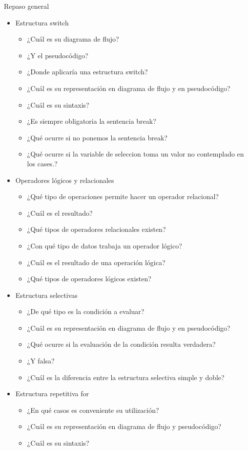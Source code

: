 \documentclass[xcolor=pdftex,table,11pt]{beamer}
\begin{document}
\begin{frame}[allowframebreaks]{Repaso general}
\begin{itemize}
		\item Estructura switch
		\begin{itemize}
		\item  ¿Cuál es su diagrama de flujo?
		\item  ¿Y el pseudocódigo? 
		\item  ¿Donde aplicaría una estructura switch?
		\item ¿Cuál es su representación en diagrama de flujo y en pseudocódigo?
		\item  ¿Cuál es su sintaxis?
		
		\item  ¿Es siempre obligatoria la sentencia break? 
		\item  ¿Qué ocurre si no ponemos la sentencia break? 
		\item  ¿Qué ocurre si la variable de seleccion toma un valor no contemplado en los cases.? 
		\end{itemize}
		
		
		\item Operadores lógicos y relacionales
		\begin{itemize}
		\item  ¿Qué tipo de operaciones permite hacer un operador relacional?
		\item  ¿Cuál es el resultado?
		\item   ¿Qué tipos de operadores relacionales existen?
		\item  ¿Con qué tipo de datos trabaja un operador lógico?
		\item  ¿Cuál es el resultado de una operación lógica?
		\item  ¿Qué tipos de operadores lógicos existen? 
	\end{itemize}
	
			\item Estructura selectivas
		\begin{itemize}
		\item  ¿De qué tipo es la condición a evaluar?
		\item ¿Cuál es su representación en diagrama de flujo y en pseudocódigo?
		\item  ¿Qué ocurre si la evaluación de la condición resulta verdadera?
		\item   ¿Y falsa?
		\item  ¿Cuál es la diferencia entre la estructura selectiva simple y doble?
	\end{itemize}
	
			\item Estructura repetitiva for
		\begin{itemize}
		\item  ¿En qué casos es conveniente su utilización?
	    \item  ¿Cuál es su representación en diagrama de flujo y pseudocódigo?
		\item  ¿Cuál es su sintaxis?
	\end{itemize}


\end{itemize}
\end{frame}
\end{document}
